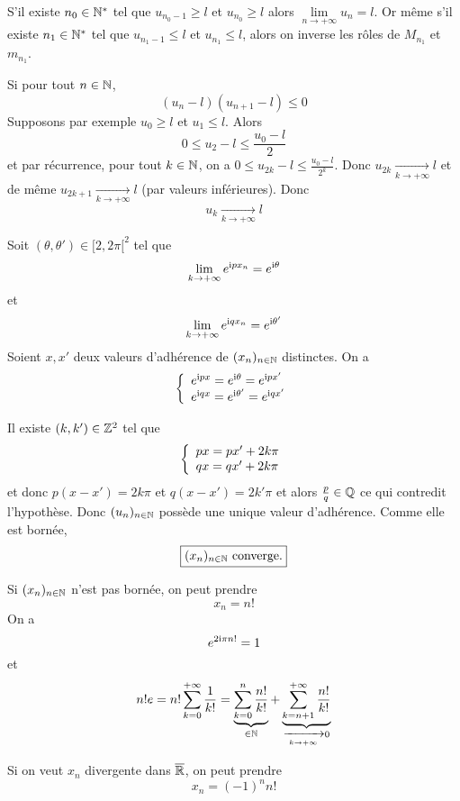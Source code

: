 \begin{solution}
	S'il existe $n_{0}\in\mathbb{N}^{*}$ tel que $u_{n_{0}-1}\geqslant l$ et $u_{n_{0}}\geqslant l$ alors $\lim\limits_{n\to+\infty}u_{n}=l$. Or même s'il existe $n_{1}\in\mathbb{N}^{*}$ tel que $u_{n_{1}-1}\leqslant l$ et $u_{n_{1}}\leqslant l$, alors on inverse les rôles de $M_{n_{1}}$ et $m_{n_{1}}$.

	Si pour tout $n\in\mathbb{N}$,
	$$(u_{n}-l)(u_{n+1}-l)\leqslant 0$$
	Supposons par exemple $u_{0}\geqslant l$ et $u_{1}\leqslant l$. Alors 
	$$0\leqslant u_{2}-l\leqslant\frac{u_{0}-l}{2}$$
	et par récurrence, pour tout $k\in\mathbb{N}$, on a $0\leqslant u_{2k}-l\leqslant\frac{u_{0}-l}{2^{k}}$.
	Donc $u_{2k}\xrightarrow[k\to+\infty]{}l$ et de même $u_{2k+1}\xrightarrow[k\to+\infty]{}l$ (par valeurs inférieures). Donc 
	$$\boxed{u_{k}\xrightarrow[k\to+\infty]{}l}$$
\end{solution}

\begin{solution}
	Soit $(\theta,\theta')\in[2,2\pi[^{2}$ tel que 
	$$\lim\limits_{k\to+\infty}e^{\mathrm{i} px_{n}}=e^{\mathrm{i} \theta}$$ et 
	$$\lim\limits_{k\to+\infty}e^{\mathrm{i} qx_{n}}=e^{\mathrm{i} \theta'}$$
	Soient $x,x'$ deux valeurs d'adhérence de $(x_{n})_{n\in\mathbb{N}}$ distinctes. On a 
	$$
	\left\{
		\begin{array}[]{l}
			e^{\i px}=e^{\i \theta}=e^{\i px'}\\
			e^{\i qx}=e^{\i \theta'}=e^{\i qx'}
		\end{array}
	\right.
	$$

	Il existe $(k,k')\in\mathbb{Z}^{2}$ tel que 
	$$
	\left\{
		\begin{array}[]{l}
			px=px'+2k\pi\\
			qx=qx'+2k\pi
		\end{array}
	\right.
	$$
	et donc $p(x-x')=2k\pi$ et $q(x-x')=2k'\pi$ et alors $\frac{p}{q}\in\mathbb{Q}$ ce qui contredit l'hypothèse. Donc $(u_{n})_{n\in\mathbb{N}}$ possède une unique valeur d'adhérence. Comme elle est bornée,
	$$\boxed{(x_{n})_{n\in\mathbb{N}}\text{ converge.}}$$

	Si $(x_{n})_{n\in\mathbb{N}}$ n'est pas bornée, on peut prendre 
	$$\boxed{x_{n}=n!}$$
	On a 
	$$e^{2\mathrm{i} \pi n!}=1$$
	et 
	$$n!e=n!\sum_{k=0}^{+\infty}\frac{1}{k!}=\underbrace{\sum_{k=0}^{n}\frac{n!}{k!}}_{\in\mathbb{N}}+\underbrace{\sum_{k=n+1}^{+\infty}\frac{n!}{k!}}_{\xrightarrow[k\to+\infty]{}0}$$
	
	Si on veut $x_{n}$ divergente dans $\overline{\mathbb{R}}$, on peut prendre 
	$$\boxed{x_{n}=(-1)^{n}n!}$$
\end{solution}

